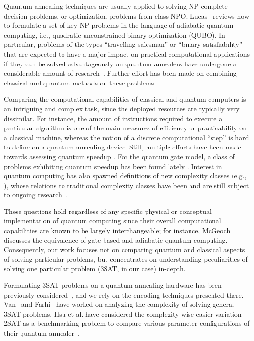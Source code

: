 Quantum annealing techniques are usually applied to solving NP-complete decision problems, or optimization problems from class NPO. Lucas~\cite{lucas2014ising} reviews how to formulate a set of key NP problems in the language of adiabatic quantum computing, i.e., quadratic unconstrained binary optimization (QUBO). In particular, problems of the types ``travelling salesman'' or ``binary satisfiability'' that are expected to have a major impact on practical computational applications if they can be solved advantageously on quantum annealers have undergone a considerable amount of research~\cite{heim2017designing,warren2017small,moylett2017quantum,strand2017zzz,benjamin2017measurement,neukart2017traffic}. Further effort has been made on combining classical and quantum methods on these problems~\cite{feld2018hybrid}.

Comparing the computational capabilities of classical and quantum computers is an intriguing and complex task, since the deployed resources are typically very dissimilar. For instance, the amount of instructions required to execute a particular algorithm is one of the main measures of efficiency or practicability on a classical machine, whereas the notion of a discrete computational ``step'' is hard to define on a quantum annealing device. Still, multiple efforts have been made towards assessing quantum speedup \cite{somma2012quantum,ronnow2014defining}. For the quantum gate model, a class of problems exhibiting quantum speedup has been found lately \cite{bravyi2018quantum}. Interest in quantum computing has also spawned definitions of new complexity classes (e.g., \cite{klauck2017complexity,morimae2017merlinization}), whose relations to traditional complexity classes have been and are still subject to ongoing research~\cite{bernstein1997quantum,marriott2005quantum}.

These questions hold regardless of any specific physical or conceptual implementation of quantum computing since their overall computational capabilities are known to be largely interchangeable; for instance, McGeoch~\cite{mcgeoch2014adiabatic} discusses the
equivalence of gate-based and adiabatic quantum computing. Consequently,
our work focuses not on comparing quantum and classical aspects of solving particular problems, but concentrates on understanding peculiarities
of solving one particular problem (3SAT, in our case) in-depth.

Formulating 3SAT problems on a quantum annealing hardware has been previously considered~\cite{choi2011different,choi2010adiabatic,farhi2000quantum}, and we rely on the encoding techniques presented there. Van~\cite{van2001powerful} and Farhi~\cite{farhi2009quantum} have worked on analyzing the complexity of solving general 3SAT problems. Hsu et al. have considered the complexity-wise easier variation 2SAT as a benchmarking problem to compare various parameter configurations of their quantum annealer~\cite{hsu2018quantum}.
 
